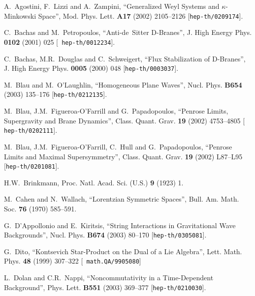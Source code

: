 \documentclass[11pt,a4paper]{article}
\begin{document}
\begin{thebibliography}{99}

\baselineskip=12pt

 A.~Agostini, F.~Lizzi and A.~Zampini, ``Generalized
  Weyl Systems and $\kappa$-Minkowski Space'', Mod. Phys. Lett. {\bf
  A17} (2002) 2105--2126 [{\tt hep-th/0209174}].

 C.~Bachas and M.~Petropoulos, ``Anti-de~Sitter
  D-Branes'', J. High Energy Phys. {\bf 0102} (2001) 025 [{\tt
  hep-th/0012234}].

 C.~Bachas, M.R.~Douglas and C.~Schweigert, ``Flux
  Stabilization of D-Branes'', J. High Energy Phys. {\bf 0005} (2000)
  048 [{\tt hep-th/0003037}].

 M.~Blau and M.~O'Laughlin, ``Homogeneous Plane Waves'',
  Nucl. Phys. {\bf B654} (2003) 135--176 [{\tt hep-th/0212135}].

 M.~Blau, J.M.~Figueroa-O'Farrill and G.~Papadopoulos,
  ``Penrose Limits, Supergravity and Brane Dynamics'',
  Class. Quant. Grav. {\bf 19} (2002) 4753--4805 [{\tt
  hep-th/0202111}].

 M.~Blau, J.M.~Figueroa-O'Farrill, C.~Hull and
  G.~Papadopoulos, ``Penrose Limits and Maximal Supersymmetry'',
  Class. Quant. Grav. {\bf 19} (2002) L87--L95 [{\tt hep-th/0201081}].

 H.W.~Brinkmann, Proc. Natl. Acad. Sci. (U.S.) {\bf 9}
  (1923) 1.

 M.~Cahen and N.~Wallach, ``Lorentzian Symmetric
  Spaces'', Bull. Am. Math. Soc. {\bf 76} (1970) 585--591.

 G.~D'Appollonio and E.~Kiritsis, ``String Interactions
  in Gravitational Wave Backgrounds'', Nucl. Phys. {\bf B674} (2003)
  80--170 [{\tt hep-th/0305081}].

 G.~Dito, ``Kontsevich Star-Product on the Dual of a
  Lie Algebra'', Lett. Math. Phys. {\bf 48} (1999) 307--322 [{\tt
  math.QA/9905080}]

 L.~Dolan and C.R.~Nappi, ``Noncommutativity in a
  Time-Dependent Background'', Phys. Lett. {\bf B551} (2003) 369--377
  [{\tt hep-th/0210030}].


\end{thebibliography}
\end{document}
